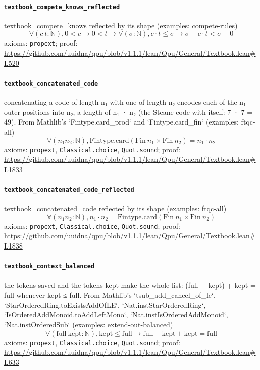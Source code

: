 \documentclass[11pt]{article}
\begin{document}
\paragraph{\texttt{textbook\_compete\_knows\_reflected}}
textbook\_compete\_knows reflected by its shape (examples: compete-rules)
\[ \forall (c\ t : \mathbb{N}), 0 < c \to 0 < t \to \forall (\sigma : \mathbb{N}), c \cdot t \le \sigma \to \sigma - c \cdot t < \sigma - 0 \]
\noindent axioms: \texttt{propext}; proof: \url{https://github.com/uuidna/qpu/blob/v1.1.1/lean/Qpu/General/Textbook.lean\#L520}

\paragraph{\texttt{textbook\_concatenated\_code}}
concatenating a code of length n₁ with one of length n₂ encodes each of the n₁ outer positions into n₂, a length of n₁ · n₂ (the Steane code with itself: 7 · 7 = 49). From Mathlib's `Fintype.card\_prod` and `Fintype.card\_fin` (examples: ftqc-all)
\[ \forall (n_{1} n_{2} : \mathbb{N}), \mathrm{Fintype.card} (\mathrm{Fin}\ n_{1} \times \mathrm{Fin}\ n_{2}) = n_{1} \cdot n_{2} \]
\noindent axioms: \texttt{propext}, \texttt{Classical.choice}, \texttt{Quot.sound}; proof: \url{https://github.com/uuidna/qpu/blob/v1.1.1/lean/Qpu/General/Textbook.lean\#L1833}

\paragraph{\texttt{textbook\_concatenated\_code\_reflected}}
textbook\_concatenated\_code reflected by its shape (examples: ftqc-all)
\[ \forall (n_{1} n_{2} : \mathbb{N}), n_{1} \cdot n_{2} = \mathrm{Fintype.card} (\mathrm{Fin}\ n_{1} \times \mathrm{Fin}\ n_{2}) \]
\noindent axioms: \texttt{propext}, \texttt{Classical.choice}, \texttt{Quot.sound}; proof: \url{https://github.com/uuidna/qpu/blob/v1.1.1/lean/Qpu/General/Textbook.lean\#L1838}

\paragraph{\texttt{textbook\_context\_balanced}}
the tokens saved and the tokens kept make the whole list: (full − kept) + kept = full whenever kept ≤ full. From Mathlib's `tsub\_add\_cancel\_of\_le`, `StarOrderedRing.toExistsAddOfLE`, `Nat.instStarOrderedRing`, `IsOrderedAddMonoid.toAddLeftMono`, `Nat.instIsOrderedAddMonoid`, `Nat.instOrderedSub` (examples: extend-out-balanced)
\[ \forall (\mathrm{full}\ \mathrm{kept} : \mathbb{N}), \mathrm{kept} \le \mathrm{full} \to \mathrm{full} - \mathrm{kept} + \mathrm{kept} = \mathrm{full} \]
\noindent axioms: \texttt{propext}, \texttt{Classical.choice}, \texttt{Quot.sound}; proof: \url{https://github.com/uuidna/qpu/blob/v1.1.1/lean/Qpu/General/Textbook.lean\#L633}
\end{document}
